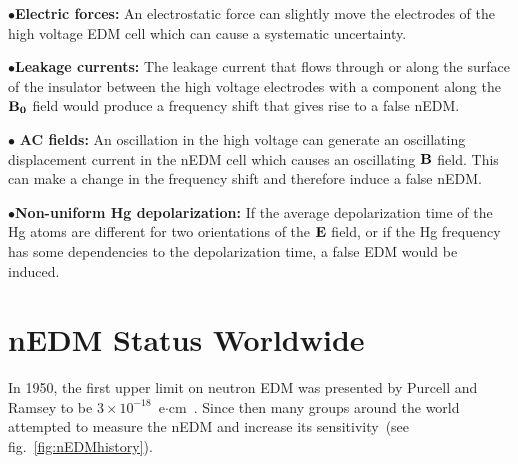 \begin{description}
\item{$\bullet$\bf{Electric forces:}} An electrostatic force can
  slightly move the electrodes of the high voltage EDM cell which can
  cause a systematic uncertainty.

\item{$\bullet$\bf{Leakage currents:}} The leakage current that flows
  through or along the surface of the insulator between the high
  voltage electrodes with a component along the $\bf{B_0}$ field would
  produce a frequency shift that gives rise to a false nEDM.

\item{$\bullet$ \bf{AC fields:}} An oscillation in the high voltage
  can generate an oscillating displacement current in the nEDM cell
  which causes an oscillating $\bf{B}$ field. This can make a change
  in the frequency shift and therefore induce a false nEDM.

\item{$\bullet$\bf{Non-uniform Hg depolarization:}} If the average
  depolarization time of the Hg atoms are different for two
  orientations of the $\bf{E}$ field, or if the Hg frequency has some
  dependencies to the depolarization time, a false EDM would be
  induced.

\end{description}





\section{nEDM Status Worldwide\label{sec:nedmWW}}
In 1950, the first upper limit on neutron EDM was presented by Purcell
and Ramsey to be $3 \times
10^{-18}$~e$\cdot$cm~\cite{PhysRev.78.807}. Since then many groups
around the world attempted to measure the nEDM and increase its
sensitivity~(see fig.~\ref{fig:nEDMhistory}).


